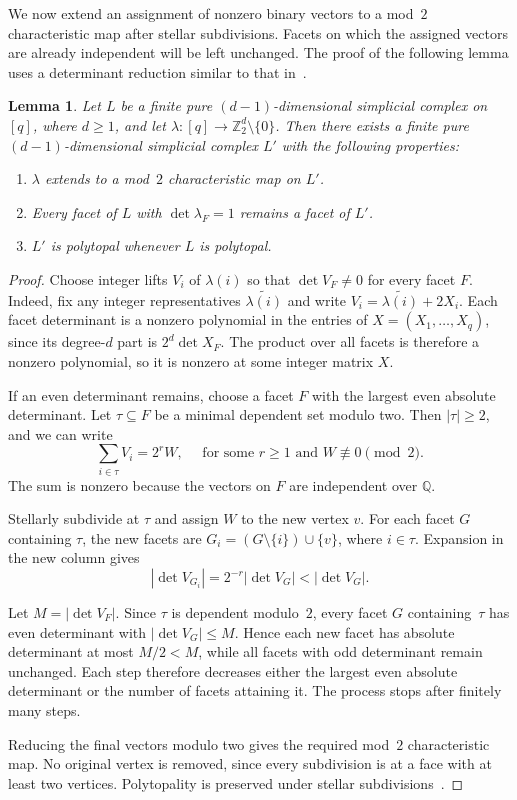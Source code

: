 \documentclass{amsart}
\theoremstyle{plain}
\newtheorem{lemma}[theorem]{Lemma}
\numberwithin{equation}{section}
\theoremstyle{remark}
\theoremstyle{definition}
\newcommand{\Z}{\mathbb Z}
\newcommand{\Q}{\mathbb Q}
\begin{document}
We now extend an assignment of nonzero binary vectors to a mod~$2$ characteristic map after stellar subdivisions.
Facets on which the assigned vectors are already independent will be left unchanged.
The proof of the following lemma uses a determinant reduction similar to that in~\cite[Theorem~2.1]{Bruns-vonThaden2017}.

\begin{lemma}\label{lem:relative-subdivision}
    Let $L$ be a finite pure $(d-1)$-dimensional simplicial complex on~$[q]$, where $d\ge1$, and let $\lambda\colon[q]\to\Z_2^d\setminus\{0\}$.
    Then there exists a finite pure $(d-1)$-dimensional simplicial complex $L'$ with the following properties:
    \begin{enumerate}
      \item $\lambda$ extends to a mod~$2$ characteristic map on $L'$.
      \item Every facet of $L$ with $\det \lambda_F = 1$ remains a facet of $L'$.
      \item $L'$ is polytopal whenever $L$ is polytopal.
    \end{enumerate}
\end{lemma}
\begin{proof}
    Choose integer lifts $V_i$ of $\lambda(i)$ so that $\det V_F\ne0$ for every facet $F$.
    Indeed, fix any integer representatives $\widetilde{\lambda(i)}$ and write $V_i = \widetilde{\lambda(i)} + 2 X_i$.
    Each facet determinant is a nonzero polynomial in the entries of $X = (X_1, \ldots, X_q)$, since its degree-$d$ part is $2^d \det X_F$.
    The product over all facets is therefore a nonzero polynomial, so it is nonzero at some integer matrix $X$.
    
    If an even determinant remains, choose a facet $F$ with the largest even absolute determinant.
    Let $\tau\subseteq F$ be a minimal dependent set modulo two.
    Then $|\tau|\ge2$, and we can write
    $$
        \sum_{i\in\tau}V_i=2^rW, \quad \text{ for some } r\ge1 \text{ and } W\not\equiv0\pmod2.
    $$
    The sum is nonzero because the vectors on $F$ are independent over $\Q$.
    
    Stellarly subdivide at $\tau$ and assign $W$ to the new vertex $v$.
    For each facet $G$ containing $\tau$, the new facets are $G_i=(G\setminus\{i\})\cup\{v\}$, where $i\in\tau$.
    Expansion in the new column gives
    $$
        |\det V_{G_i}|=2^{-r}|\det V_G|<|\det V_G|.
    $$
    
    Let $M = | \det V_F |$.
    Since $\tau$ is dependent modulo~$2$, every facet $G$ containing~$\tau$ has even determinant with $| \det V_G | \leq M$.
    Hence each new facet has absolute determinant at most $M/2 < M$, while all facets with odd determinant remain unchanged.
    Each step therefore decreases either the largest even absolute determinant or the number of facets attaining it.
    The process stops after finitely many steps.
    
    Reducing the final vectors modulo two gives the required mod~$2$ characteristic map.
    No original vertex is removed, since every subdivision is at a face with at least two vertices.
    Polytopality is preserved under stellar subdivisions~\cite{Ewald-Shephard1974}.
\end{proof}
\end{document}
